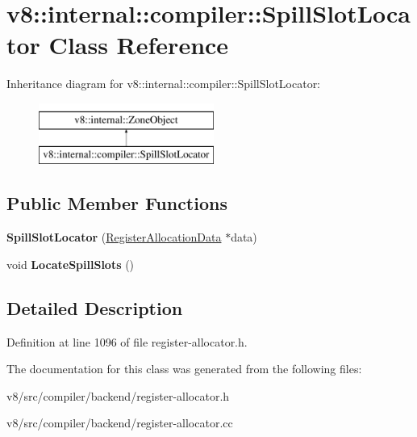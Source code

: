 \hypertarget{classv8_1_1internal_1_1compiler_1_1SpillSlotLocator}{}\section{v8\+:\+:internal\+:\+:compiler\+:\+:Spill\+Slot\+Locator Class Reference}
\label{classv8_1_1internal_1_1compiler_1_1SpillSlotLocator}
Inheritance diagram for v8\+:\+:internal\+:\+:compiler\+:\+:Spill\+Slot\+Locator\+:\begin{figure}[H]
\begin{center}
\leavevmode
\includegraphics[height=2.000000cm]{classv8_1_1internal_1_1compiler_1_1SpillSlotLocator}
\end{center}
\end{figure}
\subsection*{Public Member Functions}
\begin{DoxyCompactItemize}
\item 
\mbox{\label{classv8_1_1internal_1_1compiler_1_1SpillSlotLocator_a5f8b231f0c7ab9da0a9e6a314c2e554a}} 
{\bfseries Spill\+Slot\+Locator} (\mbox{\hyperlink{classv8_1_1internal_1_1compiler_1_1RegisterAllocationData}{Register\+Allocation\+Data}} $\ast$data)
\item 
\mbox{\label{classv8_1_1internal_1_1compiler_1_1SpillSlotLocator_a385cfd36b37f8ad2333eaa8b5cd4ec27}} 
void {\bfseries Locate\+Spill\+Slots} ()
\end{DoxyCompactItemize}


\subsection{Detailed Description}


Definition at line 1096 of file register-\/allocator.\+h.



The documentation for this class was generated from the following files\+:\begin{DoxyCompactItemize}
\item 
v8/src/compiler/backend/register-\/allocator.\+h\item 
v8/src/compiler/backend/register-\/allocator.\+cc\end{DoxyCompactItemize}
